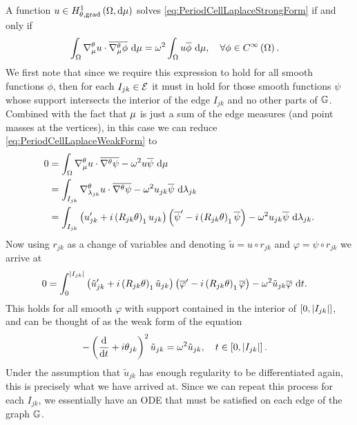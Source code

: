 A function $u\in H^1_{\theta, \mathrm{grad}}\left( \Omega, \mathrm{d}\mu \right)$ solves \eqref{eq:PeriodCellLaplaceStrongForm} if and only if
\begin{align} \label{eq:PeriodCellLaplaceWeakForm}
	\int_{\Omega}\nabla^{\theta}_{\mu}u\cdot\overline{\nabla^{\theta}_{\mu}\phi} \ \mathrm{d}\mu &= \omega^2\int_{\Omega}u\overline{\phi} \ \mathrm{d}\mu, \quad\forall \phi\in C^{\infty}\left( \Omega \right).
\end{align}
We first note that since we require this expression to hold for all smooth functions $\phi$, then for each $I_{jk}\in \mathcal{E}$ it must in hold for those smooth functions $\psi$ whose support intersects the interior of the edge $I_{jk}$ and no other parts of $\mathbb{G}$.
Combined with the fact that $\mu$ is just a sum of the edge measures (and point masses at the vertices), in this case we can reduce \eqref{eq:PeriodCellLaplaceWeakForm} to
\begin{align*}
	0 &= \int_{\Omega}\nabla^{\theta}_\mu u \cdot \overline{\nabla^{\theta}\psi} - \omega^2 u\overline{\psi} \ \mathrm{d}\mu \\
	&= \int_{I_{jk}} \nabla^{\theta}_{\lambda_{jk}}u \cdot \overline{\nabla^{\theta}\psi} - \omega^2 u_{jk}\overline{\psi}  \ \mathrm{d}\lambda_{jk} \\
	&= \int_{I_{jk}} \left( u_{jk}' + i\left( R_{jk}\theta \right)_1 u_{jk} \right)\left( \overline{\psi}' - i\left( R_{jk}\theta \right)_1 \overline{\psi}  \right) - \omega^2 u_{jk}\overline{\psi}  \ \mathrm{d}\lambda_{jk}.
\end{align*}
Now using $r_{jk}$ as a change of variables and denoting $\tilde{u} = u \circ r_{jk}$ and $\varphi = \psi\circ r_{jk}$ we arrive at
\begin{align*}
	0 &= \int_{0}^{\left\lvert I_{jk} \right\rvert} \left( \tilde{u}_{jk}' + i\left( R_{jk}\theta \right)_1 \tilde{u}_{jk} \right)\left( \overline{\varphi}' - i\left( R_{jk}\theta \right)_1 \overline{\varphi}  \right) - \omega^2 \tilde{u}_{jk}\overline{\varphi} \ \mathrm{d} t .
\end{align*}
This holds for all smooth $\varphi$ with support contained in the interior of $\left[ 0,\left\lvert I_{jk} \right\rvert \right]$, and can be thought of as the weak form of the equation
\begin{align*}
	-\left( \dfrac{\mathrm{d}}{\mathrm{d}t} + i\theta_{jk} \right)^2 \tilde{u}_{jk} &= \omega^2 \tilde{u}_{jk}, \quad t\in\left[ 0,\left\lvert I_{jk} \right\rvert \right].
\end{align*}
Under the assumption that $\tilde{u}_{jk}$ has enough regularity to be differentiated again, this is precisely what we have arrived at.
Since we can repeat this process for each $I_{jk}$, we essentially have an ODE that must be satisfied on each edge of the graph $\mathbb{G}$. \newline

